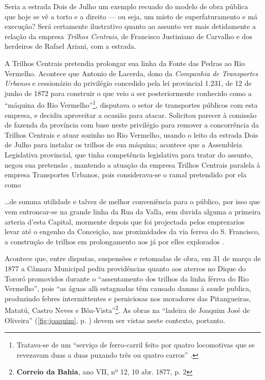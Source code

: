 Seria a estrada Dois de Julho um exemplo recuado do modelo de obra pública que hoje se vê a torto e a direito --- ou seja, um misto de superfaturamento e má execução? Será certamente ilustrativo quanto ao assunto ver mais detidamente a relação da empresa \textit{Trilhos Centrais}, de Francisco Justiniano de Carvalho e dos herdeiros de Rafael Ariani, com a estrada.

A Trilhos Centrais pretendia prolongar sua linha da Fonte das Pedras ao Rio Vermelho. Acontece que Antonio de Lacerda, dono da \textit{Companhia de Transportes Urbanos} e cessionário do privilégio concedido pela lei provincial 1.231, de 12 de junho de 1872 para construir o que veio a ser posteriormente conhecido como a ``máquina do Rio Vermelho''\footnote{Tratava-se de um ``serviço de ferro-carril feito por quatro locomotivas que se revezavam duas a duas puxando três ou quatro carros'' \cite[p.~90]{trinchao_parafuso_2010}.}, disputava o setor de transportes públicos com esta empresa, e decidiu aproveitar a ocasião para atacar. Solicitou parecer à comissão de fazenda da província com base neste privilégio para remover a concorrência da Trilhos Centrais e atuar sozinho no Rio Vermelho, usando o leito da estrada Dois de Julho para instalar os trilhos de sua máquina; acontece que a Assembleia Legislativa provincial, que tinha competência legislativa para tratar do assunto, negou sua pretensão \cite[p.~250]{bahia_assembleia_1875}, mantendo a atuação da empresa Trilhos Centrais paralela à empresa Transportes Urbanos, pois considerava-se o ramal pretendido por ela como

\begin{citacao}
\dots de summa utilidade e talvez de melhor conveniência para o público, por isso que vem entroncar-se na grande linha da Rua da Valla, sem duvida alguma a primeira arteria d'esta Capital, mormente depois que foi projectada pelos emprezarios levar até o engenho da Conceição, nas proximidades da via ferrea do S. Francisco, a construção de trilhos em prolongamento aos já por elles explorados \cite[p.~169]{bahia_rpe_1874}.
\end{citacao}

Acontece que, entre disputas, suspensões e retomadas de obra, em 31 de março de 1877 a Câmara Municipal pediu providências quanto aos aterros no Dique do Tororó promovidos durante o ``assentamento dos trilhos da linha férrea do Rio Vermelho'', pois ``as águas alli estagnadas têm causado damno à saude publica, produzindo febres intermittentes e perniciosas nos moradores das Pitangueiras, Matatú, Castro Neves e Bôa-Vista''\footnote{\textbf{Correio da Bahia}, ano VII, nº 12, 10 abr. 1877, p. 2}. As obras na ``ladeira de Joaquim José de Oliveira'' (\autoref{fig:joaquim}, p. \pageref{fig:joaquim}) devem ser vistas neste contexto, portanto. 

